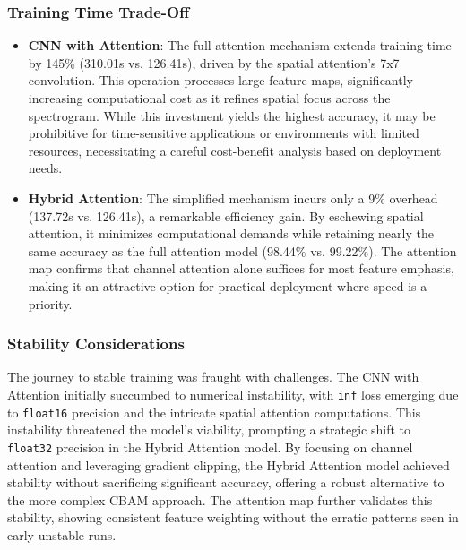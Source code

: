 \documentclass[12pt]{article}
\begin{document}
\subsubsection{Training Time Trade-Off}
\begin{itemize}
    \item \textbf{CNN with Attention}: The full attention mechanism extends training time by 145\% (310.01s vs. 126.41s), driven by the spatial attention's 7x7 convolution. This operation processes large feature maps, significantly increasing computational cost as it refines spatial focus across the spectrogram. While this investment yields the highest accuracy, it may be prohibitive for time-sensitive applications or environments with limited resources, necessitating a careful cost-benefit analysis based on deployment needs.
    \item \textbf{Hybrid Attention}: The simplified mechanism incurs only a 9\% overhead (137.72s vs. 126.41s), a remarkable efficiency gain. By eschewing spatial attention, it minimizes computational demands while retaining nearly the same accuracy as the full attention model (98.44\% vs. 99.22\%). The attention map confirms that channel attention alone suffices for most feature emphasis, making it an attractive option for practical deployment where speed is a priority.
\end{itemize}

\subsubsection{Stability Considerations}
The journey to stable training was fraught with challenges. The CNN with Attention initially succumbed to numerical instability, with \texttt{inf} loss emerging due to \texttt{float16} precision and the intricate spatial attention computations. This instability threatened the model's viability, prompting a strategic shift to \texttt{float32} precision in the Hybrid Attention model. By focusing on channel attention and leveraging gradient clipping, the Hybrid Attention model achieved stability without sacrificing significant accuracy, offering a robust alternative to the more complex CBAM approach. The attention map further validates this stability, showing consistent feature weighting without the erratic patterns seen in early unstable runs.
\end{document}
